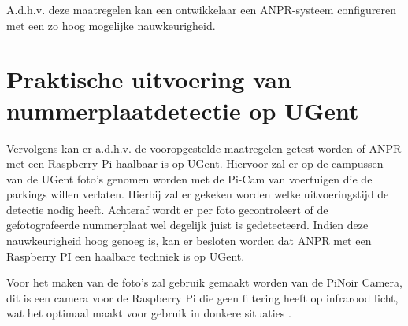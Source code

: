 A.d.h.v. deze maatregelen kan een ontwikkelaar een ANPR-systeem configureren met een zo hoog mogelijke nauwkeurigheid.

\section{Praktische uitvoering van nummerplaatdetectie op UGent}
Vervolgens kan er a.d.h.v. de vooropgestelde maatregelen getest worden of ANPR met een Raspberry Pi haalbaar is op UGent. Hiervoor zal er op de campussen van de UGent foto's genomen worden met de Pi-Cam van voertuigen die de parkings willen verlaten. Hierbij zal er gekeken worden welke uitvoeringstijd de detectie nodig heeft. Achteraf wordt er per foto gecontroleert of de gefotografeerde nummerplaat wel degelijk juist is gedetecteerd. Indien deze nauwkeurigheid hoog genoeg is, kan er besloten worden dat ANPR met een Raspberry PI een haalbare techniek is op UGent.

Voor het maken van de foto's zal gebruik gemaakt worden van de PiNoir Camera, dit is een camera voor de Raspberry Pi die geen filtering heeft op infrarood licht, wat het optimaal maakt voor gebruik in donkere situaties \autocite{raspberrypisitemodelpinoir}.